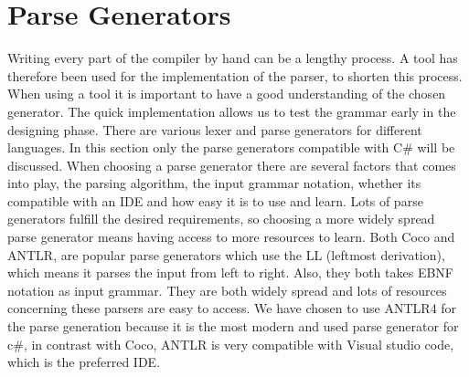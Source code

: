\section{Parse Generators}
Writing every part of the compiler by hand can be a lengthy process. A tool has therefore been used for the implementation of the parser, to shorten this process. When using a tool it is important to have a good understanding of the chosen generator. The quick implementation allows us to test the grammar early in the designing phase.
There are various lexer and parse generators for different languages. In this section only the parse generators compatible with C# 
will be discussed. When choosing a parse generator there are several factors that comes into play, the parsing algorithm, the input grammar notation,
whether its compatible with an IDE and how easy it is to use and learn. Lots of parse generators fulfill the desired requirements, 
so choosing a more widely spread parse generator means having access to more resources to learn. Both Coco and ANTLR, are popular parse generators which use the LL (leftmost derivation), which means it parses the input from left to right. 
Also, they both takes EBNF notation as input grammar. They are both widely spread and lots of resources concerning these parsers are easy to access. \newline
We have chosen to use ANTLR4 for the parse generation because it is the most modern and used parse generator for c#, in contrast with Coco, ANTLR is very compatible with Visual studio code, which is the preferred IDE. 
